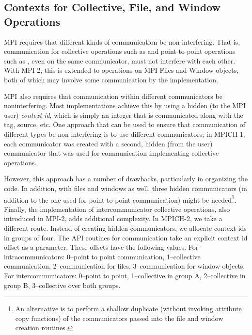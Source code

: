 \subsection{Contexts for Collective, File, and Window Operations}
\label{sec:comm-for-coll}
MPI requires that different kinds of communication be
non-interfering.  That is, communication for collective operations
such as  and point-to-point operations such as
, even on the same communicator, must not interfere
with each other.  With MPI-2, this is extended to operations on MPI
Files and Window objects, both of which may involve some communication
by the implementation.

MPI also requires that communication within different
communicators be noninterfering.  Most implementations achieve this by
using a hidden (to the MPI user) \emph{context id}, which is simply an
integer that is communicated along with the tag, source, etc.  
One approach that can be used to ensure that
communication of different types be non-interfering is to use
different communicators; in MPICH-1, each communicator was created
with a second, hidden (from the user) communicator that was used for
communication implementing collective operations.  

However, this approach has a number of drawbacks, particularly in
organizing the code.  In addition, with files and windows as well,
three hidden communicators (in addition to the one used for point-to-point
communication) might be needed\footnote{An alternative is
to perform a shallow duplicate (without invoking attribute copy
functions) of the communicators passed into the file and window
creation routines.}.  Finally, the implementation of intercommunicator
collective operations, also introduced in MPI-2, adds additional
complexity.  In MPICH-2, we take a different route.  Instead of
creating hidden communicators, we allocate context ids in groups of
four.  The API routines for communication take an explicit context id
offset as a parameter.  These offsets have the following values.  For
intracommunicators: 0--point to point communication, 1--collective
communication, 2--communication for files, 3--communication for window
objects.  For intercommunicators: 0--point to point, 1--collective in
group A, 2--collective in group B, 3--collective over both groups.
%

